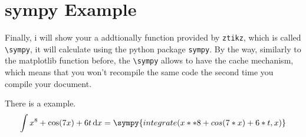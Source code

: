 \documentclass[lang=en, layout=oneside]{zlatex}
\begin{document}
\section{sympy Example}
Finally, i will show your a addtionally function provided by \texttt{ztikz}, which 
is called \texttt{\textbackslash sympy}, it will calculate using the python package
\texttt{sympy}. By the way, similarly to the matplotlib function before, the \texttt{\textbackslash sympy}
allows to have the cache mechanism, which means that you won't recompile the same code the 
second time you compile your document. 

There is a example.
\[
    \int x^8 + \cos(7x) + 6t\,\mathrm{d}x  
    = \sympy{integrate( x**8 + cos(7*x) + 6*t, x )}    
\]

\end{document}
